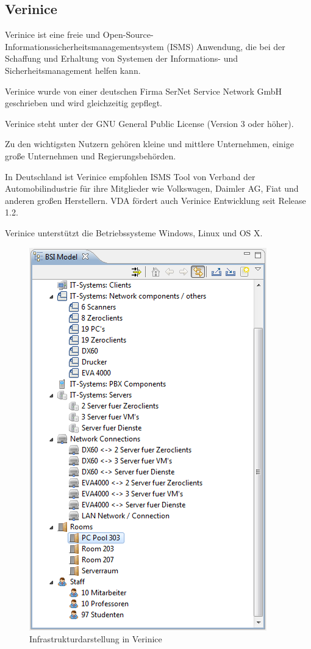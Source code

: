 \subsection{Verinice}
Verinice ist eine freie und Open-Source-Informationssicherheitsmanagementsystem (ISMS) Anwendung, die bei der Schaffung und Erhaltung von Systemen der Informations- und Sicherheitsmanagement helfen kann.

Verinice wurde von einer deutschen Firma SerNet Service Network GmbH geschrieben und wird gleichzeitig gepflegt.

Verinice steht unter der GNU General Public License (Version 3 oder höher).

Zu den wichtigsten Nutzern gehören kleine und mittlere Unternehmen, einige große Unternehmen und Regierungsbehörden.

In Deutschland ist Verinice empfohlen ISMS Tool von Verband der Automobilindustrie 
für ihre Mitglieder wie Volkswagen, Daimler AG, Fiat und anderen großen Herstellern.
VDA fördert auch Verinice Entwicklung seit Release 1.2.

Verinice unterstützt die Betriebssysteme Windows, Linux und OS X.

\begin{figure}[htbp]
	\includegraphics[scale=0.5]{images/verinicestruktur}
	\caption{Infrastrukturdarstellung in Verinice}
	\label{fig:idoitschema}
\end{figure}


